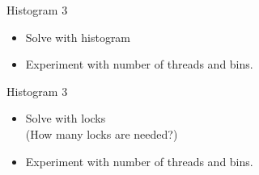\begin{numberedframe}{Histogram 3}
  \begin{itemize}
  \item Solve with histogram
  \item Experiment with number of threads and bins.
  \end{itemize}
\end{numberedframe}

\begin{numberedframe}{Histogram 3}
  \begin{itemize}
  \item Solve with locks\\
    (How many locks are needed?)
  \item Experiment with number of threads and bins.
  \end{itemize}
\end{numberedframe}

\endinput

\begin{numberedframe}{}
  \begin{itemize}
  \item 
  \end{itemize}
\end{numberedframe}

